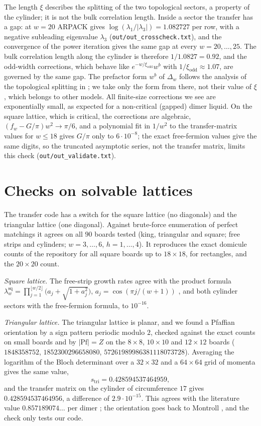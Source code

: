 \documentclass[11pt]{amsart}
\theoremstyle{definition}
\theoremstyle{remark}
\newcommand{\file}[1]{\texttt{#1}}
\begin{document}
The length $\xi$ describes the splitting of the two topological sectors, a property of the
cylinder; it is not the bulk correlation length. Inside a sector the transfer has a gap: at
$w = 20$ ARPACK gives $\log(\lambda_1/|\lambda_3|) = 1.082727$ per row, with a negative subleading
eigenvalue $\lambda_3$ (\file{out/out\_crosscheck.txt}), and the convergence of the power iteration
gives the same gap at every $w = 20, \dots, 25$. The bulk correlation length along the cylinder is
therefore $1/1.0827 = 0.92$, and the odd-width corrections, which behave like
$e^{-w/\xi_{\mathrm{odd}}} w^b$ with $1/\xi_{\mathrm{odd}} \approx 1.07$, are governed by the same
gap. The prefactor form $w^b$ of $\Delta_w$ follows the analysis of the topological splitting in
\cite{ioselevich2002, yaokivelson2012}; we take only the form from there, not their value of
$\xi$, which belongs to other models. All finite-size corrections we see are exponentially small,
as expected for a non-critical (gapped) dimer liquid. On the square lattice, which is critical, the
corrections are algebraic, $(f_w - G/\pi)w^2 \to \pi/6$, and a polynomial fit in $1/w^2$ to the
transfer-matrix values for $w \le 18$ gives $G/\pi$ only to $6\cdot10^{-8}$; the exact free-fermion
values give the same digits, so the truncated asymptotic series, not the transfer matrix, limits
this check (\file{out/out\_validate.txt}).

\section{Checks on solvable lattices}\label{sec:checks}
The transfer code has a switch for the square lattice (no diagonals) and the triangular lattice
(one diagonal). Against brute-force enumeration of perfect matchings it agrees on all $90$ boards
tested (king, triangular and square; free strips and cylinders; $w = 3, \dots, 6$, $h = 1, \dots, 4$).
It reproduces the exact domicule counts of the repository for all square boards up to
$18\times18$, for rectangles, and the $20\times20$ count.

\emph{Square lattice.} The free-strip growth rates agree with the product formula
$\lambda^{\mathrm{sq}}_w = \prod_{j=1}^{\lfloor w/2 \rfloor} \bigl(a_j + \sqrt{1 + a_j^2}\bigr)$,
$a_j = \cos(\pi j/(w+1))$ \cite{kasteleyn1961}, and both cylinder sectors with the free-fermion
formula, to $10^{-16}$.

\emph{Triangular lattice.} The triangular lattice is planar, and we found a Pfaffian orientation
by a sign pattern periodic modulo $2$, checked against the exact counts on small boards and by
$|\mathrm{Pf}| = Z$ on the $8\times8$, $10\times10$ and $12\times12$ boards ($1848358752$,
$1852300296658080$, $57261989986381118073728$). Averaging the logarithm of the Bloch determinant
over a $32\times32$ and a $64\times64$ grid of momenta gives the same value,
\[
  s_{\mathrm{tri}} = 0.428594537464959,
\]
and the transfer matrix on the cylinder of circumference $17$ gives $0.428594537464956$, a
difference of $2.9\cdot10^{-15}$. This agrees with the literature value $0.857189074\ldots$ per
dimer \cite{wu2006}; the orientation goes back to Montroll \cite{montroll1964}, and the check only
tests our code.
\end{document}
